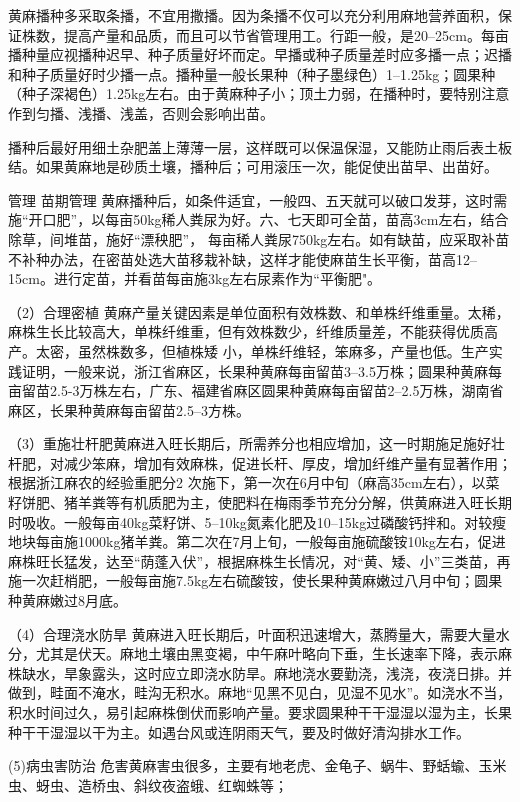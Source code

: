 \documentclass{ctexbook}
\begin{document}
黄麻播种多采取条播，不宜用撒播。因为条播不仅可以充分利用麻地营养面积，保证株数，提高产量和品质，而且可以节省管理用工。行距一般，是20--25cm。每亩播种量应视播种迟早、种子质量好坏而定。早播或种子质量差时应多播一点；迟播和种子质量好时少播一点。播种量一般长果种（种子墨绿色）1--1.25kg；圆果种（种子深褐色）1.25kg左右。由于黄麻种子小；顶土力弱，在播种时，要特别注意作到匀播、浅播、浅盖，否则会影响出苗。

播种后最好用细土杂肥盖上薄薄一层，这样既可以保温保湿，又能防止雨后表土板结。如果黄麻地是砂质土壤，播种后；可用滚压一次，能促使出苗早、出苗好。

管理
苗期管理 黄麻播种后，如条件适宜，一般四、五天就可以破口发芽，这时需施“开口肥”，以每亩50kg稀人粪尿为好。六、七天即可全苗，苗高3cm左右，结合除草，间堆苗，施好“漂秧肥”，
每亩稀人粪尿750kg左右。如有缺苗，应采取补苗不补种办法，在密苗处选大苗移栽补缺，这样才能使麻苗生长平衡，苗高12--15cm。进行定苗，并看苗每亩施3kg左右尿素作为“平衡肥"。

（2）合理密植 黄麻产量关键因素是单位面积有效株数、和单株纤维重量。太稀，麻株生长比较高大，单株纤维重，但有效株数少，纤维质量差，不能获得优质高产。太密，虽然株数多，但植株矮
小，单株纤维轻，笨麻多，产量也低。生产实践证明，一般来说，浙江省麻区，长果种黄麻每亩留苗3--3.5万株；圆果种黄麻每亩留苗2.5-3万株左右，广东、福建省麻区圆果种黄麻每亩留苗2--2.5万株，湖南省麻区，长果种黄麻每亩留苗2.5--3方株。

（3）重施壮杆肥黄麻进入旺长期后，所需养分也相应增加，这一时期施足施好壮杆肥，对减少笨麻，增加有效麻株，促进长杆、厚皮，增加纤维产量有显著作用；根据浙江麻农的经验重肥分2
次施下，第一次在6月中旬（麻高35cm左右），以菜籽饼肥、猪羊粪等有机质肥为主，使肥料在梅雨季节充分分解，供黄麻进入旺长期时吸收。一般每亩40kg菜籽饼、5--10kg氮素化肥及10--15kg过磷酸钙拌和。对较瘦地块每亩施1000kg猪羊粪。第二次在7月上旬，一般每亩施硫酸铵10kg左右，促进麻株旺长猛发，达至“荫蓬入伏”，根据麻株生长情况，对“黄、矮、小”三类苗，再施一次赶梢肥，一般每亩施7.5kg左右硫酸铵，使长果种黄麻嫩过八月中旬；圆果种黄麻嫩过8月底。

（4）合理浇水防旱 黄麻进入旺长期后，叶面积迅速增大，蒸腾量大，需要大量水分，尤其是伏天。麻地土壤由黑变褐，中午麻叶略向下垂，生长速率下降，表示麻株缺水，旱象露头，这时应立即浇水防旱。麻地浇水要勤浇，浅浇，夜浇日排。并做到，畦面不淹水，畦沟无积水。麻地“见黑不见白，见湿不见水”。如浇水不当，积水时间过久，易引起麻株倒伏而影响产量。要求圆果种干干湿湿以湿为主，长果种干干湿湿以干为主。如遇台风或连阴雨天气，要及时做好清沟排水工作。

(5)病虫害防治 危害黄麻害虫很多，主要有地老虎、金龟子、蜗牛、野蛞蝓、玉米虫、蚜虫、造桥虫、斜纹夜盗蛾、红蜘蛛等；
\end{document}
